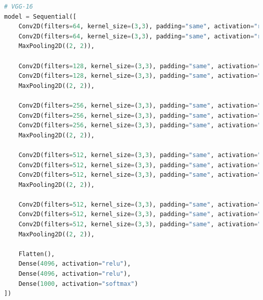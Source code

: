 \begin{lstlisting}[language=Python]
# VGG-16
model = Sequential([
	Conv2D(filters=64, kernel_size=(3,3), padding="same", activation="relu"),
	Conv2D(filters=64, kernel_size=(3,3), padding="same", activation="relu"),
	MaxPooling2D((2, 2)),
	
	Conv2D(filters=128, kernel_size=(3,3), padding="same", activation="relu"),
	Conv2D(filters=128, kernel_size=(3,3), padding="same", activation="relu"),
	MaxPooling2D((2, 2)),
	
	Conv2D(filters=256, kernel_size=(3,3), padding="same", activation="relu"),
	Conv2D(filters=256, kernel_size=(3,3), padding="same", activation="relu"),
	Conv2D(filters=256, kernel_size=(3,3), padding="same", activation="relu"),
	MaxPooling2D((2, 2)),
	
	Conv2D(filters=512, kernel_size=(3,3), padding="same", activation="relu"),
	Conv2D(filters=512, kernel_size=(3,3), padding="same", activation="relu"),
	Conv2D(filters=512, kernel_size=(3,3), padding="same", activation="relu"),
	MaxPooling2D((2, 2)),
	
	Conv2D(filters=512, kernel_size=(3,3), padding="same", activation="relu"),
	Conv2D(filters=512, kernel_size=(3,3), padding="same", activation="relu"),
	Conv2D(filters=512, kernel_size=(3,3), padding="same", activation="relu"),
	MaxPooling2D((2, 2)),
	
	Flatten(),
	Dense(4096, activation="relu"),
	Dense(4096, activation="relu"),
	Dense(1000, activation="softmax")					
])
\end{lstlisting}

\newpage